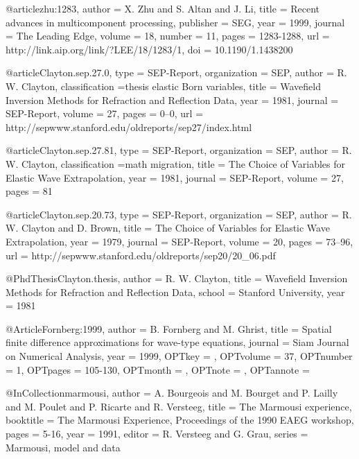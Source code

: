 @article{zhu:1283,
  author =	 {X. Zhu and S. Altan and J. Li},
  title =	 {Recent advances in multicomponent processing},
  publisher =	 {SEG},
  year =	 1999,
  journal =	 {The Leading Edge},
  volume =	 18,
  number =	 11,
  pages =	 {1283-1288},
  url =		 {http://link.aip.org/link/?LEE/18/1283/1},
  doi =		 {10.1190/1.1438200}
}

@article{Clayton.sep.27.0,
  type =	 {SEP-Report},
  organization = {SEP},
  author =	 {R. W. Clayton},
  classification ={thesis elastic {Born} variables},
  title =	 {Wavefield Inversion Methods for Refraction and
                  Reflection Data},
  year =	 1981,
  journal =	 {SEP-Report},
  volume =	 27,
  pages =	 {0--0},
  url =
                  {http://sepwww.stanford.edu/oldreports/sep27/index.html}
}

@article{Clayton.sep.27.81,
  type =	 {SEP-Report},
  organization = {SEP},
  author =	 {R. W. Clayton},
  classification ={math migration},
  title =	 {The Choice of Variables for Elastic Wave
                  Extrapolation},
  year =	 1981,
  journal =	 {SEP-Report},
  volume =	 27,
  pages =	 81
}

@article{Clayton.sep.20.73,
  type =	 {SEP-Report},
  organization = {SEP},
  author =	 {R. W. Clayton and D. Brown},
  title =	 {The Choice of Variables for Elastic Wave
                  Extrapolation},
  year =	 1979,
  journal =	 {SEP-Report},
  volume =	 20,
  pages =	 {73--96},
  url =
                  {http://sepwww.stanford.edu/oldreports/sep20/20_06.pdf}
}

@PhdThesis{Clayton.thesis,
  author =	 {R. W. Clayton},
  title =	 {Wavefield Inversion Methods for Refraction and
                  Reflection Data},
  school =	 {Stanford University},
  year =	 1981
}

@Article{Fornberg:1999,
  author = 	 {B. Fornberg and M. Ghrist},
  title = 	 {Spatial finite difference approximations for
                  wave-type equations},
  journal = 	 {Siam Journal on Numerical Analysis},
  year = 	 {1999},
  OPTkey = 	 {},
  OPTvolume = 	 {37},
  OPTnumber = 	 {1},
  OPTpages = 	 {105-130},
  OPTmonth = 	 {},
  OPTnote = 	 {},
  OPTannote = 	 {}
}

@InCollection{marmousi,
  author =	 {A. Bourgeois and M. Bourget and P. Lailly and
                  M. Poulet and P. Ricarte and R. Versteeg},
  title =	 {The {M}armousi experience},
  booktitle =	 {The Marmousi Experience, Proceedings of the 1990
                  EAEG workshop},
  pages =	 {5-16},
  year =	 1991,
  editor =	 {R. Versteeg and G. Grau},
  series =	 {Marmousi, model and data}
}

